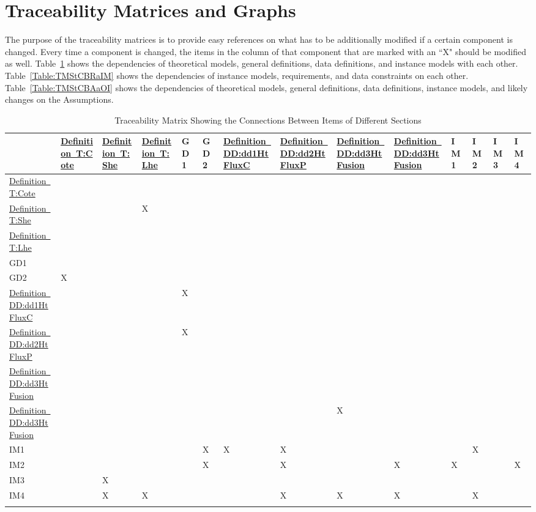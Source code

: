 \documentclass[12pt]{article}
\begin{document}
\section{Traceability Matrices and Graphs}
\label{Sec:TMaG}
The purpose of the traceability matrices is to provide easy references on what has to be additionally modified if a certain component is changed. Every time a component is changed, the items in the column of that component that are marked with an ``X" should be modified as well. Table~\ref{Table:TMStCBIoDS} shows the dependencies of theoretical models, general definitions, data definitions, and instance models with each other. Table~\ref{Table:TMStCBRaIM} shows the dependencies of instance models, requirements, and data constraints on each other. Table~\ref{Table:TMStCBAaOI} shows the dependencies of theoretical models, general definitions, data definitions, instance models, and likely changes on the Assumptions.
\begin{longtable}{l l l l l l l l l l l l l l}
\toprule
 & \hyperref[T:Cote]{Definition~T:Cote} & \hyperref[T:She]{Definition~T:She} & \hyperref[T:Lhe]{Definition~T:Lhe} & GD1 & GD2 & \hyperref[DD:dd1HtFluxC]{Definition~DD:dd1HtFluxC} & \hyperref[DD:dd2HtFluxP]{Definition~DD:dd2HtFluxP} & \hyperref[DD:dd3HtFusion]{Definition~DD:dd3HtFusion} & \hyperref[DD:dd3HtFusion]{Definition~DD:dd3HtFusion} & IM1 & IM2 & IM3 & IM4
\\
\midrule
\hyperref[T:Cote]{Definition~T:Cote} &  &  &  &  &  &  &  &  &  &  &  &  & 
\\
\hyperref[T:She]{Definition~T:She} &  &  & X &  &  &  &  &  &  &  &  &  & 
\\
\hyperref[T:Lhe]{Definition~T:Lhe} &  &  &  &  &  &  &  &  &  &  &  &  & 
\\
GD1 &  &  &  &  &  &  &  &  &  &  &  &  & 
\\
GD2 & X &  &  &  &  &  &  &  &  &  &  &  & 
\\
\hyperref[DD:dd1HtFluxC]{Definition~DD:dd1HtFluxC} &  &  &  & X &  &  &  &  &  &  &  &  & 
\\
\hyperref[DD:dd2HtFluxP]{Definition~DD:dd2HtFluxP} &  &  &  & X &  &  &  &  &  &  &  &  & 
\\
\hyperref[DD:dd3HtFusion]{Definition~DD:dd3HtFusion} &  &  &  &  &  &  &  &  &  &  &  &  & 
\\
\hyperref[DD:dd3HtFusion]{Definition~DD:dd3HtFusion} &  &  &  &  &  &  &  & X &  &  &  &  & 
\\
IM1 &  &  &  &  & X & X & X &  &  &  & X &  & 
\\
IM2 &  &  &  &  & X &  & X &  & X & X &  &  & X
\\
IM3 &  & X &  &  &  &  &  &  &  &  &  &  & 
\\
IM4 &  & X & X &  &  &  & X & X & X &  & X &  & 
\\
\bottomrule
\caption{Traceability Matrix Showing the Connections Between Items of Different Sections}
\label{Table:TMStCBIoDS}
\end{longtable}
\end{document}
